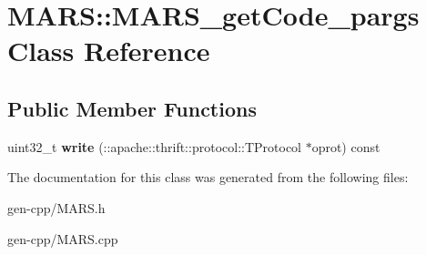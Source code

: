 \hypertarget{classMARS_1_1MARS__getCode__pargs}{}\section{M\+A\+RS\+:\+:M\+A\+R\+S\+\_\+get\+Code\+\_\+pargs Class Reference}
\label{classMARS_1_1MARS__getCode__pargs}
\subsection*{Public Member Functions}
\begin{DoxyCompactItemize}
\item 
\mbox{\label{classMARS_1_1MARS__getCode__pargs_a2cba857b0354dbc6a8f1f56e5798e3f7}} 
uint32\+\_\+t {\bfseries write} (\+::apache\+::thrift\+::protocol\+::\+T\+Protocol $\ast$oprot) const
\end{DoxyCompactItemize}


The documentation for this class was generated from the following files\+:\begin{DoxyCompactItemize}
\item 
gen-\/cpp/M\+A\+R\+S.\+h\item 
gen-\/cpp/M\+A\+R\+S.\+cpp\end{DoxyCompactItemize}
